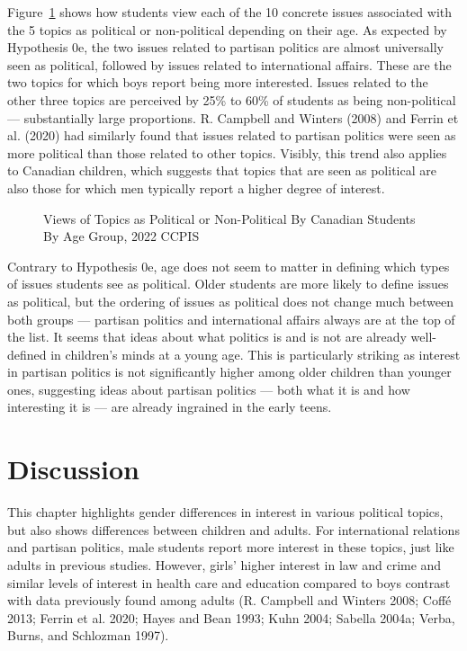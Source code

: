 \documentclass[
  letterpaper,
  DIV=11,
  numbers=noendperiod]{scrreprt}
\begin{document}
Figure~\ref{fig-political} shows how students view each of the 10
concrete issues associated with the 5 topics as political or
non-political depending on their age. As expected by Hypothesis 0e, the
two issues related to partisan politics are almost universally seen as
political, followed by issues related to international affairs. These
are the two topics for which boys report being more interested. Issues
related to the other three topics are perceived by 25\% to 60\% of
students as being non-political --- substantially large proportions. R.
Campbell and Winters (2008) and Ferrin et al. (2020) had similarly found
that issues related to partisan politics were seen as more political
than those related to other topics. Visibly, this trend also applies to
Canadian children, which suggests that topics that are seen as political
are also those for which men typically report a higher degree of
interest.

\begin{figure}


\caption{\label{fig-political}Views of Topics as Political or
Non-Political By Canadian Students By Age Group, 2022 CCPIS}

\end{figure}%

Contrary to Hypothesis 0e, age does not seem to matter in defining which
types of issues students see as political. Older students are more
likely to define issues as political, but the ordering of issues as
political does not change much between both groups --- partisan politics
and international affairs always are at the top of the list. It seems
that ideas about what politics is and is not are already well-defined in
children's minds at a young age. This is particularly striking as
interest in partisan politics is not significantly higher among older
children than younger ones, suggesting ideas about partisan politics ---
both what it is and how interesting it is --- are already ingrained in
the early teens.

\section{Discussion}\label{discussion}

This chapter highlights gender differences in interest in various
political topics, but also shows differences between children and
adults. For international relations and partisan politics, male students
report more interest in these topics, just like adults in previous
studies. However, girls' higher interest in law and crime and similar
levels of interest in health care and education compared to boys
contrast with data previously found among adults (R. Campbell and
Winters 2008; Coffé 2013; Ferrin et al. 2020; Hayes and Bean 1993; Kuhn
2004; Sabella 2004a; Verba, Burns, and Schlozman 1997).
\end{document}
